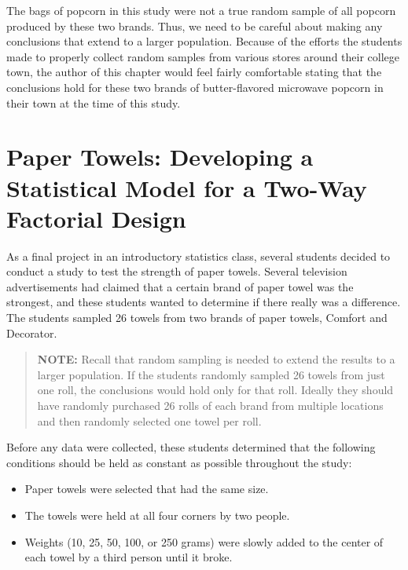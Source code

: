 \documentclass[
]{book}
\providecommand{\tightlist}{%
  \setlength{\itemsep}{0pt}\setlength{\parskip}{0pt}}
\begin{document}
The bags of popcorn in this study were not a true random sample of all popcorn produced by these two brands. Thus, we need to be careful about making any conclusions that extend to a larger population. Because of the efforts the students made to properly collect random samples from various stores around their college town, the author of this chapter would feel fairly comfortable stating that the conclusions hold for these two brands of butter-flavored microwave popcorn in their town at the time of this study.

\hypertarget{paper-towels-developing-a-statistical-model-for-a-two-way-factorial-design}{%
\section{Paper Towels: Developing a Statistical Model for a Two-Way Factorial Design}\label{paper-towels-developing-a-statistical-model-for-a-two-way-factorial-design}}

As a final project in an introductory statistics class, several students decided to conduct a study to test the strength of paper towels. Several television advertisements had claimed that a certain brand of paper towel was the strongest, and these students wanted to determine if there really was a difference. The students sampled 26 towels from two brands of paper towels, Comfort and Decorator.

\begin{quote}
\textbf{NOTE:} Recall that random sampling is needed to extend the results to a larger population. If the students randomly sampled 26 towels from just one roll, the conclusions would hold only for that roll. Ideally they should have randomly purchased 26 rolls of each brand from multiple locations and then randomly selected one towel per roll.
\end{quote}

Before any data were collected, these students determined that the following conditions should be held as constant as possible throughout the study:

\begin{itemize}
\tightlist
\item
  Paper towels were selected that had the same size.
\item
  The towels were held at all four corners by two people.
\item
  Weights (10, 25, 50, 100, or 250 grams) were slowly added to the center of each towel by a third person until it broke.
\end{itemize}
\end{document}
